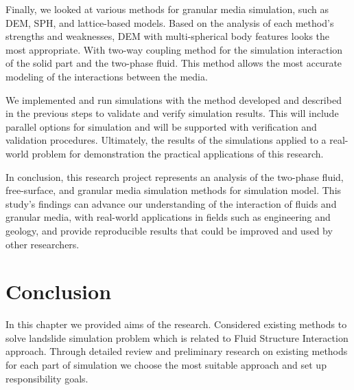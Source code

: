 Finally, we looked at various methods for granular media simulation, such as DEM, SPH, and lattice-based models. Based on the analysis of each method's strengths and weaknesses, DEM with multi-spherical body features looks the most appropriate. With two-way coupling method for the simulation interaction of the solid part and the two-phase fluid. This method allows the most accurate modeling of the interactions between the media.

We implemented and run simulations with the method developed and described in the previous steps to validate and verify simulation results. This will include parallel options for simulation and will be supported with verification and validation procedures.
Ultimately, the results of the simulations applied to a real-world problem for demonstration the practical applications of this research.

In conclusion, this research project represents an analysis of the two-phase fluid, free-surface, and granular media simulation methods for simulation model. This study's findings can advance our understanding of the interaction of fluids and granular media, with real-world applications in fields such as engineering and geology, and provide reproducible results that could be improved and used by other researchers.

\section{Conclusion}

In this chapter we provided aims of the research. Considered existing methods to solve landslide simulation problem which is related to Fluid Structure Interaction approach. Through detailed review and preliminary research on existing methods for each part of simulation we choose the most suitable approach and set up responsibility goals. 